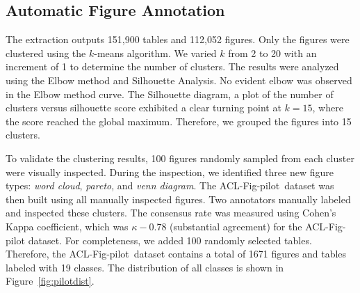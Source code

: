 \documentclass{article}
\newcommand{\scifigp}{{\sc ACL-Fig-pilot}}
\begin{document}



\subsection{Automatic Figure Annotation}
The extraction outputs 151,900 tables and 112,052 figures. Only the figures were clustered using the $k$-means algorithm. We varied $k$ from 2 to 20 with an increment of 1 to determine the number of clusters. The results were analyzed using the Elbow method and Silhouette Analysis. No evident elbow was observed in the Elbow method curve. The Silhouette diagram, a plot of the number of clusters versus silhouette score exhibited a clear turning point at $k=15$, where the score reached the global maximum. Therefore, we grouped the figures into 15 clusters. 

To validate the clustering results, 100 figures randomly sampled from each cluster were visually inspected. During the inspection, we identified three new figure types: \emph{word cloud}, \emph{pareto}, and \emph{venn diagram}. The \scifigp\ dataset was then built using all manually inspected figures. Two annotators manually labeled and inspected these clusters. The consensus rate was measured using Cohen's Kappa coefficient, which was $\kappa-0.78$ (substantial agreement) for the {\scifigp} dataset.  
For completeness, we added 100 randomly selected tables. Therefore, the \scifigp\ dataset contains a total of 1671 figures and tables labeled with 19 classes. The distribution of all classes is shown in Figure~\ref{fig:pilotdist}. 
\end{document}
